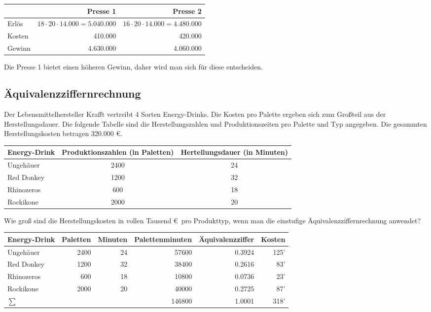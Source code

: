 \documentclass[11pt, a4paper]{article}
\begin{document}
\begin{enumerate}
		\vspace{\baselineskip}
		\begin{tabular}{l|r|r}
			& Presse 1 & Presse 2 \\ \hline
			Erlös & $18 \cdot 20 \cdot 14.000 =5.040.000$ & $16 \cdot 20 \cdot 14.000 = 4.480.000$ \\
			Kosten & 410.000 & 420.000 \\ \hline
			Gewinn & 4.630.000 & 4.060.000
		\end{tabular}
		
		\vspace{\baselineskip}
		Die Presse 1 bietet einen höheren Gewinn, daher wird man sich für diese entscheiden.
\end{enumerate}

\subsection{Äquivalenzziffernrechnung}
Der Lebensmittelhersteller Krafft vertreibt 4 Sorten Energy-Drinks. Die Kosten pro Palette ergeben sich zum Großteil aus der Herstellungsdauer. Die folgende Tabelle sind die Herstellungszahlen und Produktionszeiten pro Palette und Typ angegeben. Die gesammten Herstellungskosten betragen 320.000 \euro.

\begin{tabular}{lcc}
	Energy-Drink & Produktionszahlen (in Paletten) & Hertellungsdauer (in Minuten) \\ \hline
	Ungehäuer & 2400 & 24 \\
	Red Donkey & 1200 & 32 \\
	Rhinozeros & 600 & 18 \\
	Rockikone & 2000 & 20
\end{tabular}

\vspace{\baselineskip}
Wie groß sind die Herstellungskosten in vollen Tausend \euro \ pro Produkttyp, wenn man die einstufige Äquivalenzziffernrechnung anwendet?

\vspace{\baselineskip}
\begin{tabular}{lrrrrr}
	Energy-Drink & Paletten & Minuten & Palettenminuten & Äquivalenzziffer & Kosten \\ \hline
	Ungehäuer & 2400 & 24 & 57600 & 0.3924 & 125' \\
	Red Donkey & 1200 & 32 & 38400 & 0.2616 & 83' \\
	Rhinozeros & 600 & 18 & 10800 & 0.0736 & 23' \\
	Rockikone & 2000 & 20 & 40000 & 0.2725 & 87' \\ \hline
	$\sum$ & & & 146800 & 1.0001 & 318'
\end{tabular}
\end{document}
